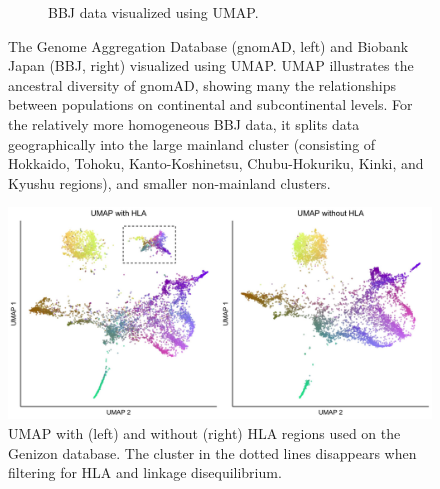 \documentclass[12pt]{article}
\begin{document}
\begin{figure}[h!]
\begin{subfigure}[b]{0.49\linewidth}
    \caption{BBJ data visualized using UMAP.}
    \label{fig:BBJ_UMAP}
  \end{subfigure}
  \caption{The Genome Aggregation Database (gnomAD, left) and Biobank Japan (BBJ, right) visualized using UMAP. UMAP illustrates the ancestral diversity of gnomAD, showing many the relationships between populations on continental and subcontinental levels. For the relatively more homogeneous BBJ data, it splits data geographically into the large mainland cluster (consisting of Hokkaido, Tohoku, Kanto-Koshinetsu, Chubu-Hokuriku, Kinki, and Kyushu regions), and smaller non-mainland clusters.}
  \label{fig:external_UMAP}
\end{figure}

\clearpage

\begin{figure}[h!]
  \centering
    \includegraphics[width=\linewidth]{external_images/umap_hla_comparison_highlighted.jpg}
  \caption{UMAP with (left) and without (right) HLA regions used on the Genizon database. The cluster in the dotted lines disappears when filtering for HLA and linkage disequilibrium.}
  \label{fig:HLA}
\end{figure}

\clearpage
\end{document}
